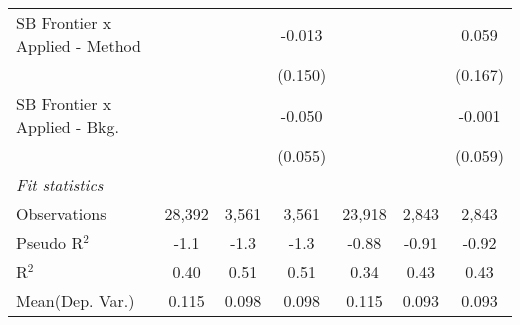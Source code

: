 \begin{tabular}{lcccccc}
   SB Frontier x Applied - Method &              &               & -0.013       &              &         & 0.059\\   
                                  &              &               & (0.150)      &              &         & (0.167)\\   
   SB Frontier x Applied - Bkg.   &              &               & -0.050       &              &         & -0.001\\   
                                  &              &               & (0.055)      &              &         & (0.059)\\   
   \midrule
   \emph{Fit statistics}\\
   Observations                   & 28,392       & 3,561         & 3,561        & 23,918       & 2,843   & 2,843\\  
   Pseudo R$^2$                   & -1.1         & -1.3          & -1.3         & -0.88        & -0.91   & -0.92\\  
   R$^2$                          & 0.40         & 0.51          & 0.51         & 0.34         & 0.43    & 0.43\\  
Mean(Dep. Var.) & 0.115 & 0.098 & 0.098 & 0.115 & 0.093 & 0.093 \\
   

\end{tabular}
